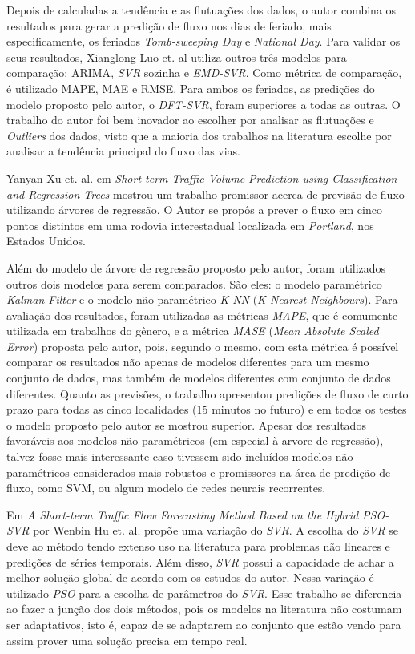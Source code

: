 Depois de calculadas a tendência e as flutuações dos dados, o autor combina os resultados para gerar a predição de fluxo nos dias de feriado, mais especificamente, os feriados \textit{ Tomb-sweeping Day} e \textit{National Day}. Para validar os seus resultados, Xianglong Luo et. al utiliza outros três modelos para comparação: \acrshort{ARIMA}, \textit{SVR} sozinha e \textit{EMD-SVR}. Como métrica de comparação, é utilizado \acrshort{MAPE}, \acrshort{MAE} e \acrshort{RMSE}.  Para ambos os feriados, as predições do modelo proposto pelo autor, o \textit{DFT-SVR}, foram superiores a todas as outras. O trabalho do autor foi bem inovador ao escolher por analisar as flutuações e \textit{Outliers} dos dados, visto que a maioria dos trabalhos na literatura escolhe por analisar a tendência principal do fluxo das vias.

Yanyan Xu et. al. em \textit{Short-term Traffic Volume Prediction using Classification and Regression Trees} \cite{xu2013short} mostrou um trabalho promissor acerca de previsão de fluxo utilizando árvores de regressão. O Autor se propôs a prever o fluxo em cinco pontos distintos em uma rodovia interestadual localizada em \textit{Portland}, nos Estados Unidos.

Além do modelo de árvore de regressão proposto pelo autor, foram utilizados outros dois modelos para serem comparados. São eles: o modelo paramétrico \textit{Kalman Filter} e o modelo não paramétrico \textit{K-NN} (\textit{K Nearest Neighbours}). Para avaliação dos resultados, foram utilizadas as métricas \textit{MAPE}, que é comumente utilizada em trabalhos do gênero, e a métrica \textit{MASE} (\textit{Mean
Absolute Scaled Error}) proposta pelo autor, pois, segundo o mesmo, com esta métrica é possível comparar os resultados não apenas de modelos diferentes para um mesmo conjunto de dados, mas também de modelos diferentes com conjunto de dados diferentes. 
Quanto as previsões, o trabalho apresentou predições de fluxo de curto prazo para todas as cinco localidades (15 minutos no futuro) e em todos os testes o modelo proposto pelo autor se mostrou superior. Apesar dos resultados favoráveis aos modelos não paramétricos (em especial à arvore de regressão), talvez fosse mais interessante caso tivessem sido incluídos modelos não paramétricos considerados mais robustos e promissores na área de predição de fluxo, como \acrshort{SVM}, ou algum modelo de redes neurais recorrentes. 


Em \textit{A Short-term Traffic Flow Forecasting Method Based on the Hybrid PSO-SVR} por Wenbin Hu et. al. \cite{Hu2016} propõe uma variação do \textit{\acrfull{SVR}}. A escolha do \textit{\acrshort{SVR}} se deve ao método tendo extenso uso na literatura para problemas não lineares e predições de séries temporais. Além disso, \textit{\acrshort{SVR}} possui a capacidade de achar a melhor solução global de acordo com os estudos do autor. Nessa variação é utilizado \textit{\acrfull{PSO}} para a escolha de parâmetros do \textit{\acrshort{SVR}}. Esse trabalho se diferencia ao fazer a junção dos dois métodos, pois os modelos na literatura não costumam ser adaptativos, isto é, capaz de se adaptarem ao conjunto que estão vendo para assim prover uma solução precisa em tempo real.

